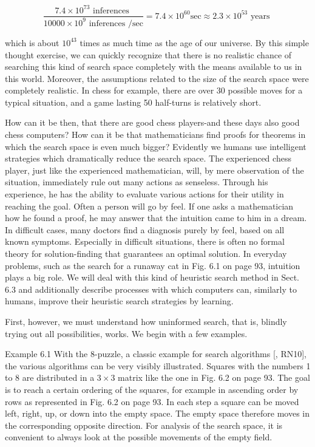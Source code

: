 \documentclass[10pt]{article}
\begin{document}
$$
\frac{7.4 \times 10^{73} \text { inferences }}{10000 \times 10^{9} \text { inferences } / \mathrm{sec}}=7.4 \times 10^{60} \mathrm{sec} \approx 2.3 \times 10^{53} \text { years }
$$

which is about $10^{43}$ times as much time as the age of our universe. By this simple thought exercise, we can quickly recognize that there is no realistic chance of searching this kind of search space completely with the means available to us in this world. Moreover, the assumptions related to the size of the search space were completely realistic. In chess for example, there are over 30 possible moves for a typical situation, and a game lasting 50 half-turns is relatively short.

How can it be then, that there are good chess players-and these days also good chess computers? How can it be that mathematicians find proofs for theorems in which the search space is even much bigger? Evidently we humans use intelligent strategies which dramatically reduce the search space. The experienced chess player, just like the experienced mathematician, will, by mere observation of the situation, immediately rule out many actions as senseless. Through his experience, he has the ability to evaluate various actions for their utility in reaching the goal. Often a person will go by feel. If one asks a mathematician how he found a proof, he may answer that the intuition came to him in a dream. In difficult cases, many doctors find a diagnosis purely by feel, based on all known symptoms. Especially in difficult situations, there is often no formal theory for solution-finding that guarantees an optimal solution. In everyday problems, such as the search for a runaway cat in Fig. 6.1 on page 93, intuition plays a big role. We will deal with this kind of heuristic search method in Sect. 6.3 and additionally describe processes with which computers can, similarly to humans, improve their heuristic search strategies by learning.

First, however, we must understand how uninformed search, that is, blindly trying out all possibilities, works. We begin with a few examples.

Example 6.1 With the 8-puzzle, a classic example for search algorithms [\cite{nilsson1998new}, RN10], the various algorithms can be very visibly illustrated. Squares with the numbers 1 to 8 are distributed in a $3 \times 3$ matrix like the one in Fig. 6.2 on page 93. The goal is to reach a certain ordering of the squares, for example in ascending order by rows as represented in Fig. 6.2 on page 93. In each step a square can be moved left, right, up, or down into the empty space. The empty space therefore moves in the corresponding opposite direction. For analysis of the search space, it is convenient to always look at the possible movements of the empty field.
\end{document}
